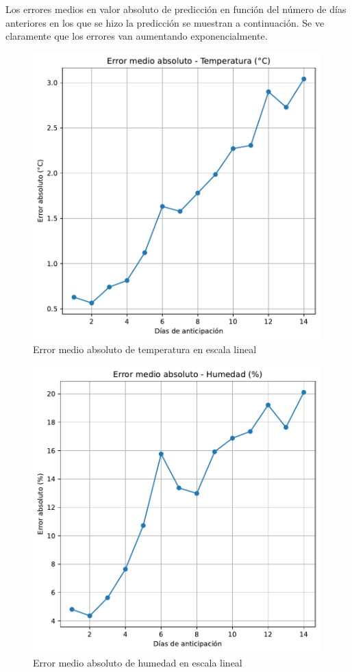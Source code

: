 \documentclass[
  10pt,
  a4paper,
  DIV=11,
  numbers=noendperiod,
  open=any]{scrreprt}
\numberwithin{equation}{chapter}
\numberwithin{equation}{section}
\renewcommand{\[}{\begin{equation}}
\renewcommand{\]}{\end{equation}}
\begin{document}
Los errores medios en valor absoluto de predicción en función del número
de días anteriores en los que se hizo la predicción se muestran a
continuación. Se ve claramente que los errores van aumentando
exponencialmente.

\begin{figure}[h]
  \centering
  \includegraphics[width=0.99\textwidth]{03-meteorologia/predicciones_files/figure-pdf/cell-3-output-1.pdf}
  \caption{Error medio absoluto de temperatura en escala lineal}
\end{figure}

\begin{figure}[h]
  \centering
  \includegraphics[width=0.99\textwidth]{03-meteorologia/predicciones_files/figure-pdf/cell-3-output-2.pdf}
  \caption{Error medio absoluto de humedad en escala lineal}
\end{figure}
\end{document}

